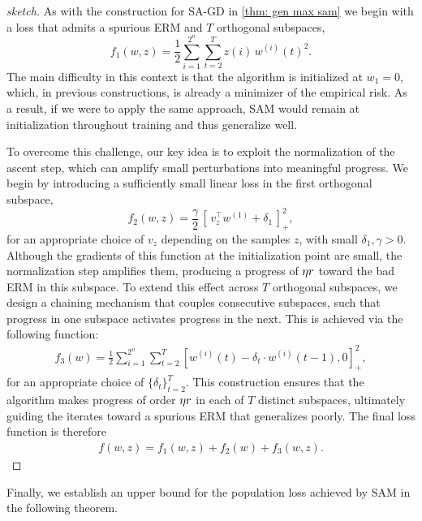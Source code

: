 \begin{proof}[sketch]
As with the construction for SA-GD in \cref{thm: gen max sam} we begin with a loss that admits a spurious ERM and $T$ orthogonal subspaces, 
$$f_1(w,z) = \frac12\sum_{i=1}^{2^n}\sum_{t=2}^{T} z(i)\,w^{(i)}(t)^2.$$ 
The main difficulty in this context is that the algorithm is initialized at $w_1 = 0$, which, in previous constructions,  is already a minimizer of the empirical risk. As a result, if we were to apply the same approach, SAM would remain at initialization throughout training and thus generalize well.  

To overcome this challenge, our key idea is to exploit the normalization of the ascent step, which can amplify small perturbations into meaningful progress. We begin by introducing a sufficiently small linear loss in the first orthogonal subspace,
\[
f_2(w,z) = \frac{\gamma}{2}\,[\,v_z^\top w^{(1)} + \delta_1\,]_+^{2},
\]
for an appropriate choice of \(v_z\) depending on the samples \(z\), with small \(\delta_1,\gamma>0\). 
Although the gradients of this function at the initialization point are small, the normalization step amplifies them, producing a progress of $\eta r$ toward the bad ERM in this subspace. To extend this effect across \(T\) orthogonal subspaces, we design a chaining mechanism that couples consecutive subspaces, such that progress in one subspace activates progress in the next. This is achieved via the following function:
\begin{align*}
    f_3(w) =  \tfrac{1}{2}\sum_{i=1}^{2^n}\sum_{t=2}^{T} 
\left[w^{(i)}(t)-\delta_t\cdot w^{(i)}(t-1),0\right]_+^{\!2},
\end{align*}
for an appropriate choice of \(\{\delta_t\}_{t=2}^T\). This construction ensures that the algorithm makes progress of order \(\eta r\) in each of \(T\) distinct subspaces, ultimately guiding the iterates toward a spurious ERM that generalizes poorly. 
The final loss function is therefore
\begin{align*}
f(w,z) = f_1(w,z) + f_2(w) + f_3(w,z). \tag*{\qedhere}
\end{align*}  
\end{proof}

Finally, we establish an upper bound for the population loss achieved by SAM in the following theorem. 

